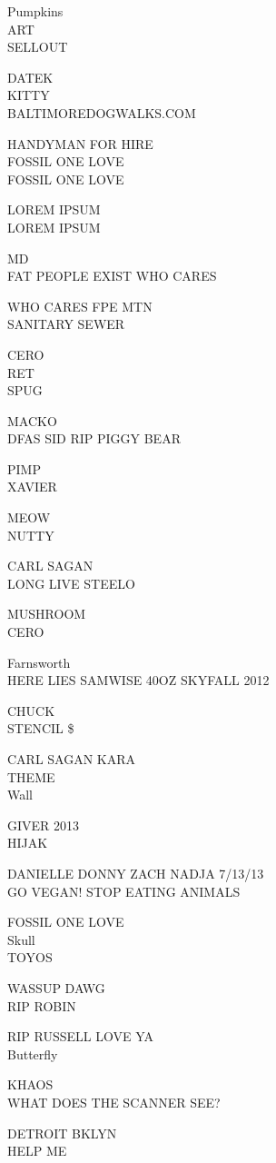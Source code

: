 \documentclass[10pt,letterpaper]{article}
\begin{document}
Pumpkins\\
ART\\
SELLOUT

DATEK\\
KITTY\\
BALTIMOREDOGWALKS.COM

HANDYMAN FOR HIRE\\
FOSSIL ONE LOVE\\
FOSSIL ONE LOVE

LOREM IPSUM\\
LOREM IPSUM

MD\\
FAT PEOPLE EXIST WHO CARES

WHO CARES FPE MTN\\
SANITARY SEWER

CERO\\
RET\\
SPUG

MACKO\\
DFAS SID RIP PIGGY BEAR

PIMP\\
XAVIER

MEOW\\
NUTTY

CARL SAGAN\\
LONG LIVE STEELO

MUSHROOM\\
CERO

Farnsworth\\
HERE LIES SAMWISE 40OZ SKYFALL 2012

CHUCK\\
STENCIL \$

CARL SAGAN KARA\\
THEME\\
Wall

GIVER 2013\\
HIJAK

DANIELLE DONNY ZACH NADJA 7/13/13\\
GO VEGAN! STOP EATING ANIMALS

FOSSIL ONE LOVE\\
Skull\\
TOYOS

WASSUP DAWG\\
RIP ROBIN

RIP RUSSELL LOVE YA\\
Butterfly

KHAOS\\
WHAT DOES THE SCANNER SEE?

DETROIT BKLYN\\
HELP ME
\end{document}

